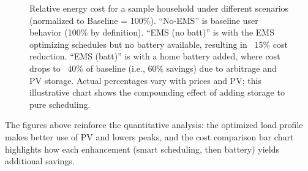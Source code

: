 \documentclass[12pt,a4paper]{article}
\begin{document}
\begin{figure}[h!]
\centering
{}
\caption{Relative energy cost for a sample household under different scenarios (normalized to Baseline = 100\%). “No-EMS” is baseline user behavior (100\% by definition). “EMS (no batt)” is with the EMS optimizing schedules but no battery available, resulting in ~15\% cost reduction. “EMS (batt)” is with a home battery added, where cost drops to ~40\% of baseline (i.e., 60\% savings) due to arbitrage and PV storage. Actual percentages vary with prices and PV; this illustrative chart shows the compounding effect of adding storage to pure scheduling.}
\end{figure}

The figures above reinforce the quantitative analysis: the optimized load profile makes better use of PV and lowers peaks, and the cost comparison bar chart highlights how each enhancement (smart scheduling, then battery) yields additional savings.
\end{document}
